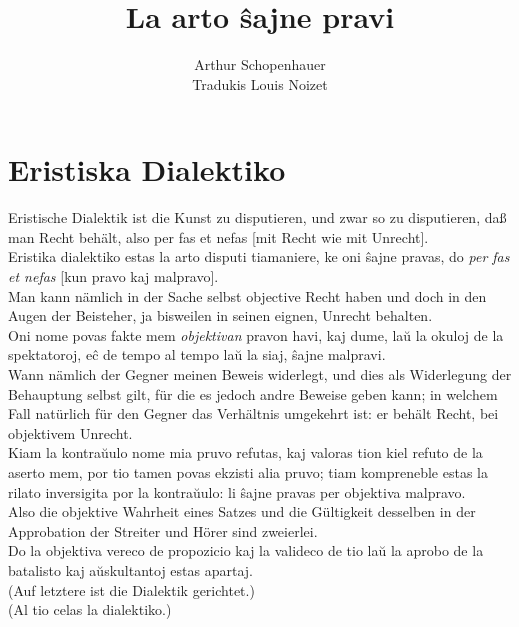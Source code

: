 \documentclass{book}
\title{La arto ŝajne pravi}
\author{Arthur Schopenhauer\\Tradukis Louis Noizet}
\date{}
\newcommand{\de}[1]{{\color{red}#1}\\}
\newcommand{\eo}[1]{#1\\}
\begin{document}
\maketitle

\chapter*{Eristiska Dialektiko}

\de{Eristische Dialektik ist die Kunst zu disputieren, und zwar so zu
disputieren, daß man Recht behält, also per fas et nefas [mit Recht wie
mit Unrecht]. }
\eo{Eristika dialektiko estas la arto disputi tiamaniere, ke oni ŝajne
pravas, do \textit{per fas et nefas} [kun pravo kaj malpravo].}
\de{Man kann nämlich in der Sache selbst objective Recht haben und doch
in den Augen der Beisteher, ja bisweilen in seinen eignen, Unrecht
behalten.}
\eo{Oni nome povas fakte mem \textit{objektivan} pravon havi, kaj dume,
laŭ la okuloj de la spektatoroj, eĉ de tempo al tempo laŭ la siaj, ŝajne
malpravi.}
\de{Wann nämlich der Gegner meinen Beweis widerlegt, und dies als
Widerlegung der Behauptung selbst gilt, für die es jedoch andre Beweise
geben kann; in welchem Fall natürlich für den Gegner das Verhältnis
umgekehrt ist: er behält Recht, bei objektivem Unrecht. }
\eo{Kiam la kontraŭulo nome mia pruvo refutas, kaj valoras tion kiel
refuto de la aserto mem, por tio tamen povas ekzisti alia pruvo; tiam
kompreneble estas la rilato inversigita por la kontraŭulo: li ŝajne
pravas per objektiva malpravo.}
\de{Also die objektive Wahrheit eines Satzes und die Gültigkeit desselben
in der Approbation der Streiter und Hörer sind zweierlei. }
\eo{Do la objektiva vereco de propozicio kaj la valideco de tio laŭ la
aprobo de la batalisto kaj aŭskultantoj estas apartaj.}
\de{(Auf letztere ist die Dialektik gerichtet.) }
\eo{(Al tio celas la dialektiko.)}
\end{document}
